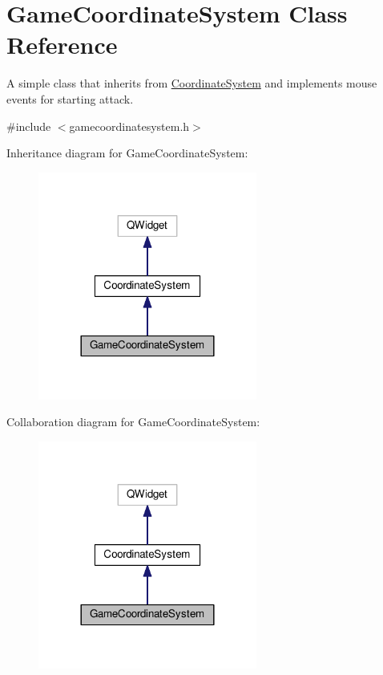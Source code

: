 \hypertarget{classGUI_1_1GameCoordinateSystem}{}\section{Game\+Coordinate\+System Class Reference}
\label{classGUI_1_1GameCoordinateSystem}


A simple class that inherits from \hyperlink{classGUI_1_1CoordinateSystem}{Coordinate\+System} and implements mouse events for starting attack.  




{\ttfamily \#include $<$gamecoordinatesystem.\+h$>$}



Inheritance diagram for Game\+Coordinate\+System\+:\nopagebreak
\begin{figure}[H]
\begin{center}
\leavevmode
\includegraphics[width=204pt]{classGUI_1_1GameCoordinateSystem__inherit__graph}
\end{center}
\end{figure}


Collaboration diagram for Game\+Coordinate\+System\+:\nopagebreak
\begin{figure}[H]
\begin{center}
\leavevmode
\includegraphics[width=204pt]{classGUI_1_1GameCoordinateSystem__coll__graph}
\end{center}
\end{figure}
